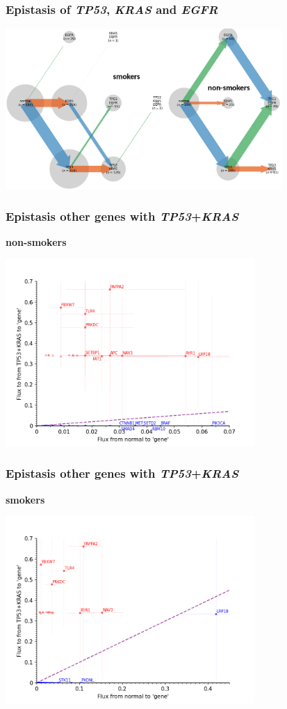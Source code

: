 \documentclass{beamer}
\begin{document}
\begin{frame}
  \frametitle{Epistasis of \textit{TP53}, \textit{KRAS} and \textit{EGFR}}
    \includegraphics[height=2.4in]{tp53_kras_egfr}
\end{frame}

\begin{frame}
  \frametitle{Epistasis other genes with \textit{TP53}+\textit{KRAS}}
  \begin{center}
    \textbf{non-smokers}
  \end{center}
    \includegraphics[height=2.8in]{lambdas_from_normal_nonsmoking_plus_vs_lambdas_from_110_nonsmoking_plus}
\end{frame}

\begin{frame}
  \frametitle{Epistasis other genes with \textit{TP53}+\textit{KRAS}}

  \begin{center}
    \textbf{smokers}
  \end{center}
    \includegraphics[height=2.8in]{lambdas_from_normal_smoking_plus_vs_lambdas_from_110_smoking_plus}
\end{frame}
\end{document}
